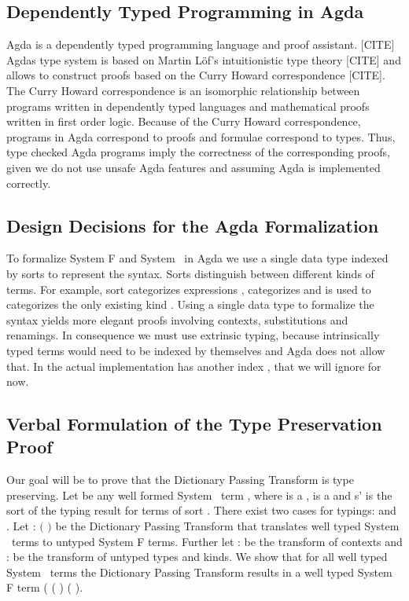 \subsection{Dependently Typed Programming in Agda}
Agda is a dependently typed programming language and proof assistant. [CITE]
Agdas type system is based on Martin Löf's intuitionistic type theory [CITE] and allows to construct proofs based on the Curry Howard correspondence [CITE]. 
The Curry Howard correspondence is an isomorphic relationship between programs written in dependently typed languages and mathematical proofs written in first order logic. 
Because of the Curry Howard correspondence, programs in Agda correspond to proofs and formulae correspond to types. 
Thus, type checked Agda programs imply the correctness of the corresponding proofs, given we do not use unsafe Agda features and assuming Agda is implemented correctly. 

\subsection{Design Decisions for the Agda Formalization}
To formalize System F and System \Fo\ in Agda we use a single data type  indexed by sorts  to represent the syntax. 
Sorts distinguish between different kinds of terms. 
For example, sort  categorizes expressions ,  categorizes  and  is used to categorizes the only existing kind . 
Using a single data type to formalize the syntax yields more elegant proofs involving contexts, substitutions and renamings. 
In consequence we must use extrinsic typing, because intrinsically typed terms      would need to be indexed by themselves and Agda does not allow that. 
In the actual implementation  has another index , that we will ignore for now.

\subsection{Verbal Formulation of the  Type Preservation Proof}
Our goal will be to prove that the Dictionary Passing Transform is type preserving. Let  be any well formed System \Fo\ term    \Constr{:} , where  is a  ,  is a   and s' is the sort of the typing result for terms of sort . There exist two cases for typings:    \Constr{:}  and    \Constr{:} . Let  : $($   \Constr{:} $)$    be the Dictionary Passing Transform that translates well typed System \Fo\ terms to untyped System F terms. Further let  :    be the transform of contexts and  :      be the transform of untyped types and kinds. We show that for all well typed System \Fo\  terms  the Dictionary Passing Transform results in a well typed System F term (   ( ) \Constr{:} ( ).